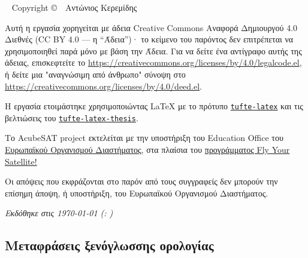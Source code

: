 \documentclass[a4paper,nobib,justified]{tufte-book}
\begin{document}
\newpage
\begin{fullwidth}
~\vfill
\thispagestyle{empty}
\setlength{\parindent}{0pt}
\setlength{\parskip}{\baselineskip}
Copyright \copyright\ \the\year\ Αντώνιος Κερεμίδης

\par{}

\justify

\par Αυτή η εργασία χορηγείται με άδεια Creative Commons Αναφορά Δημιουργού 4.0 Διεθνές (CC BY 4.0 --- η ``Άδεια'')· το κείμενο του παρόντος δεν επιτρέπεται να χρησιμοποιηθεί παρά μόνο με βάση την Άδεια. Για να δείτε ένα αντίγραφο αυτής της άδειας, επισκεφτείτε το
\url{https://creativecommons.org/licenses/by/4.0/legalcode.el}, ή δείτε μια "αναγνώσιμη από άνθρωπο" σύνοψη στο \url{https://creativecommons.org/licenses/by/4.0/deed.el}.

\par Η εργασία ετοιμάστηκε χρησιμοποιώντας \LaTeX{} με το πρότυπο \href{https://ctan.org/pkg/tufte-latex?lang=en}{\texttt{tufte-latex}} και τις βελτιώσεις του \href{https://github.com/lalider/tufte-latex-thesis}{\texttt{tufte-latex-thesis}}.

\par Το AcubeSAT project εκτελείται με την υποστήριξη του Education Office του \href{https://www.esa.int/}{Ευρωπαϊκού Οργανισμού Διαστήματος}, στα πλαίσια του \href{https://www.esa.int/Education/CubeSats_-_Fly_Your_Satellite/}{προγράμματος Fly Your Satellite!}

\par Οι απόψεις που εκφράζονται στο παρόν από τους συγγραφείς δεν μπορούν  την επίσημη άποψη, ή υποστήριξη, του Ευρωπαϊκού Οργανισμού Διαστήματος.

\par\textit{Εκδόθηκε στις {\today{}}  (\texttt{\gitcommit}: \gitcommitmessage)}
\end{fullwidth}

\tableofcontents

\begin{fullwidth}
\listoffigures

\listoftables

\chapter*{Μεταφράσεις ξενόγλωσσης ορολογίας}

\bgroup
\setlength\parskip{.8ex}
\egroup

\bgroup
\setlength\parskip{1ex}
\egroup

\end{fullwidth}
\end{document}
